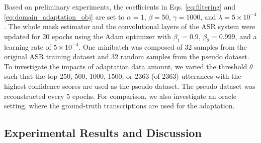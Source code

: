 \documentclass[a4paper]{article}
\begin{document}
Based on preliminary experiments,
the coefficients in Eqs. \eqref{eq:filtering} and \eqref{eq:domain_adaptation_obj} are set to
$\alpha \!=\! 1$, $\beta \!=\! 50$, $\gamma \!=\! 1000$, and
$\lambda \!=\! 5 \!\times\! 10^{-4}$.
The whole mask estimator
and the convolutional layers of the ASR system
were updated for 20 epochs
using the Adam optimizer \cite{DBLP:journals/corr/KingmaB14} with $\beta_1 \!=\! 0.9$, $\beta_2 \!=\! 0.999$, and
a learning rate of $5 \!\times\! 10^{-4}$.
One minibatch was composed of
32 samples from the original ASR training dataset
and 32 random samples from the pseudo dataset.
To investigate the impacts of adaptation data amount,
we varied the threshold $\theta$ such that
the top 250, 500, 1000, 1500, or 2363 (of 2363) utterances with the highest confidence scores are used as the pseudo dataset.
The pseudo dataset was reconstructed every 5 epochs.
For comparison, we also investigate an oracle setting,
where the ground-truth transcriptions are used for the adaptation.

\subsection{Experimental Results and Discussion}
\end{document}
